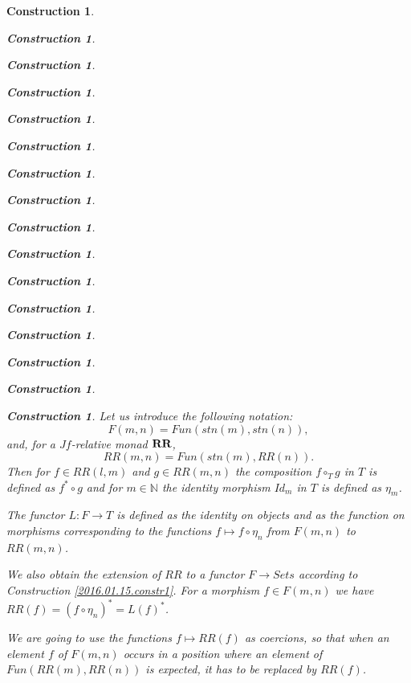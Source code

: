 \documentclass[12pt]{amsart}
\numberwithin{proposition}{subsection}
\newtheorem{construction}[proposition]{Construction}
\newcommand{\sr}{\rightarrow}
\newcommand{\nn}{{\mathbb N}}
\newcommand{\nat}{\nn}
\newcommand{\mbind}[1]{{#1^*}}
\newcommand{\hc}{\circ_{T}}
\newcommand{\RR}{{\bf RR}}
\begin{document}
\begin{construction}
\begin{construction}
\begin{construction}
\begin{construction}
\begin{construction}
\begin{construction}
\begin{construction}
\begin{construction}
\begin{construction}
\begin{construction}
\begin{construction}
\begin{construction}
\begin{construction}
\begin{construction}
\begin{construction}
\begin{construction}
Let us introduce the following notation:
%
$$F(m,n)=Fun(stn(m),stn(n)),$$
%
and, for a $Jf$-relative monad $\RR$,
%
$$RR(m,n)=Fun(stn(m),RR(n)).$$
%
Then for $f\in RR(l,m)$ and $g\in RR(m,n)$ the composition $f\hc g$ in $T$ is
defined as $\mbind{f}\circ g$ and for $m\in\nat$ the identity morphism $Id_m$
in $T$ is defined as $\eta_{m}$.

The functor $L:F\sr T$ is defined as the identity on objects and as the
function on morphisms corresponding to the functions $f\mapsto f\circ \eta_{n}$
from $F(m,n)$ to $RR(m,n)$.

We also obtain the extension of $RR$ to a functor $F\sr Sets$ according to
Construction \ref{2016.01.15.constr1}. For a morphism $f\in F(m,n)$ we have
$RR(f)=\mbind{(f\circ \eta_{n})}=\mbind{L(f)}$.

We are going to use the functions $f\mapsto RR(f)$ as coercions, so that when an
element $f$ of $F(m,n)$ occurs in a position where an element of
$Fun(RR(m),RR(n))$ is expected, it has to be replaced by $RR(f)$.


\end{construction}
\end{construction}
\end{construction}
\end{construction}
\end{construction}
\end{construction}
\end{construction}
\end{construction}
\end{construction}
\end{construction}
\end{construction}
\end{construction}
\end{construction}
\end{construction}
\end{construction}
\end{construction}
\end{document}
